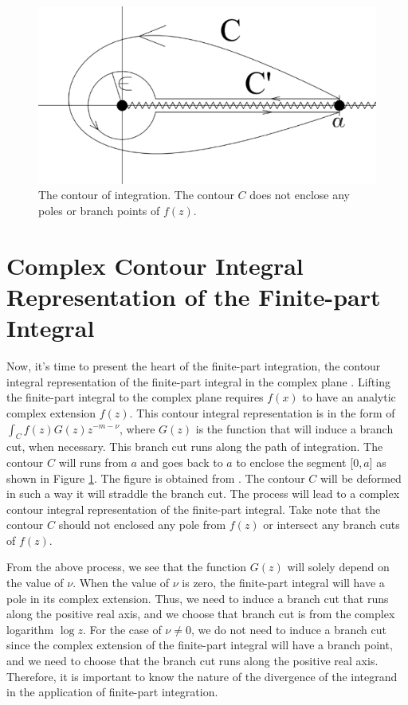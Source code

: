 \begin{figure}
    \centering
    \includegraphics[width=.75\textwidth]{c30.PNG}
    \caption{The contour of integration. The contour $C$ does not enclose any poles or branch points of $f(z)$.}
    \label{ch31}
\end{figure}

\section{Complex Contour Integral Representation of the Finite-part Integral}

Now, it's time to present the heart of the finite-part integration, the contour integral representation of the finite-part integral in the complex plane \cite{galapon2017problem, galapon2016cauchy}. Lifting the finite-part integral to the complex plane requires $f(x)$ to have an analytic complex extension $f(z)$. This contour integral representation is in the form of $\int_{C} f(z) G(z) z^{-m-\nu}$, where $G(z)$ is the function that will induce a branch cut, when necessary. This branch cut runs along the path of integration. The contour $C$ will runs from $a$ and goes back to $a$ to enclose the segment [$0, a$] as shown in Figure \ref{ch31}. The figure is obtained from \cite{doi:10.1063/5.0038274}. The contour $C$ will be deformed in such a way it will straddle the branch cut. The process will lead to a complex contour integral representation of the finite-part integral. Take note that the contour $C$ should not enclosed any pole from $f(z)$ or intersect any branch cuts of $f(z)$.

From the above process, we see that the function $G(z)$ will solely depend on the value of $\nu$. When the value of $\nu$ is zero, the finite-part integral will have a pole in its complex extension. Thus, we need to induce a branch cut that runs along the positive real axis, and we choose that branch cut is from the complex logarithm $\log z$. For the case of $\nu \neq 0$, we do not need to induce a branch cut since the complex extension of the finite-part integral will have a branch point, and we need to choose that the branch cut runs along the positive real axis. Therefore, it is important to know the nature of the divergence of the integrand in the application of finite-part integration. 


